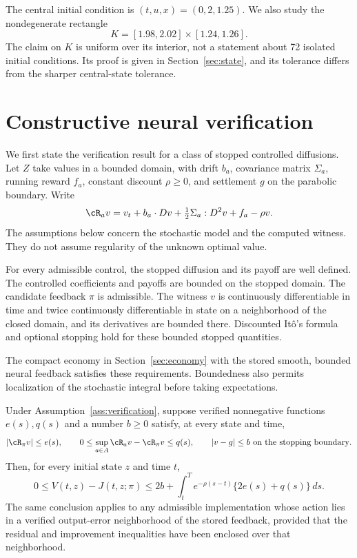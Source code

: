 The central initial condition is $(t,u,x)=(0,2,1.25)$. We also study the nondegenerate rectangle
\begin{equation}
 K=[1.98,2.02]\times[1.24,1.26].\label{eq:K}
\end{equation}
The claim on $K$ is uniform over its interior, not a statement about 72 isolated initial conditions. Its proof is given in Section~\ref{sec:state}, and its tolerance differs from the sharper central-state tolerance.

\section{Constructive neural verification}\label{sec:verification}
We first state the verification result for a class of stopped controlled diffusions. Let $Z$ take values in a bounded domain, with drift $b_a$, covariance matrix $\Sigma_a$, running reward $f_a$, constant discount $\rho\geq0$, and settlement $g$ on the parabolic boundary. Write
\[
 \cR_a v=v_t+b_a\cdot Dv+\tfrac12\Sigma_a:D^2v+f_a-\rho v.
\]
The assumptions below concern the stochastic model and the computed witness. They do not assume regularity of the unknown optimal value.

\begin{assumption}\label{ass:verification}
For every admissible control, the stopped diffusion and its payoff are well defined. The controlled coefficients and payoffs are bounded on the stopped domain. The candidate feedback $\pi$ is admissible. The witness $v$ is continuously differentiable in time and twice continuously differentiable in state on a neighborhood of the closed domain, and its derivatives are bounded there. Discounted It\^o's formula and optional stopping hold for these bounded stopped quantities.
\end{assumption}
The compact economy in Section~\ref{sec:economy} with the stored smooth, bounded neural feedback satisfies these requirements. Boundedness also permits localization of the stochastic integral before taking expectations.

\begin{theorem}\label{thm:bridge}
Under Assumption~\ref{ass:verification}, suppose verified nonnegative functions $e(s),q(s)$ and a number $b\geq0$ satisfy, at every state and time,
\begin{equation}
 |\cR_\pi v|\leq e(s),\qquad
 0\leq\sup_{a\in A}\cR_a v-\cR_\pi v\leq q(s),
 \qquad |v-g|\leq b\ \hbox{on the stopping boundary}.
 \label{eq:checks}
\end{equation}
Then, for every initial state $z$ and time $t$,
\begin{equation}
 0\leq V(t,z)-J(t,z;\pi)
 \leq 2b+\int_t^T e^{-\rho(s-t)}\{2e(s)+q(s)\}\,ds.
 \label{eq:bridgebound}
\end{equation}
The same conclusion applies to any admissible implementation whose action lies in a verified output-error neighborhood of the stored feedback, provided that the residual and improvement inequalities have been enclosed over that neighborhood.
\end{theorem}

